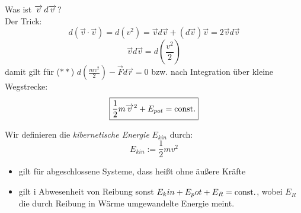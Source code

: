 \documentclass[a4paper,10pt]{scrartcl}
\begin{document}
Was ist $\overrightarrow{v} \, d\overrightarrow{v}$?\\
Der Trick:
\[
 d(\vec v \cdot \vec v)=d(v^2)=\vec v d\vec v+(d\vec v)\vec v=2\vec v d\vec v
\]
\[
 \vec v d\vec v=d(\frac{v^2}{2})
\]
 damit gilt für ($**$) $d(\frac{mv^2}{2})-\vec F d\vec r=0$
bzw. nach Integration über kleine Wegstrecke:
  \[
   \boxed{\frac{1}{2}m\overrightarrow{v}^2+E_{pot}=\text{const}.}
  \]
\begin{note*}
 Wir definieren die \emph{kibernetische Energie} $E_{kin}$ durch:
\[
 E_{kin}:=\frac{1}{2}mv^2
\]
 \begin{itemize}
  \item gilt für abgeschlossene Systeme, dass heißt ohne äußere Kräfte
  \item gilt i Abwesenheit von Reibung sonst $E_kin+E_pot+E_R=\text{const}.$, wobei $E_R$ die durch Reibung in Wärme umgewandelte Energie meint.
 \end{itemize}
\end{note*}
\end{document}
